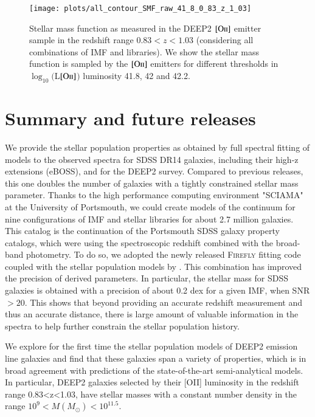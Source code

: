 \documentclass[onecolumn]{aa}
\newcommand{\OII}{$\left[\mathrm{O\textrm{\textsc{ii}}}\right]$\xspace}
\begin{document}
\begin{figure}
\begin{center}
\texttt{[image: plots/all\_contour\_SMF\_raw\_41\_8\_0\_83\_z\_1\_03]}
\label{fig:LF:sampling}
\caption{Stellar mass function as measured in the DEEP2 \OII emitter sample in the redshift range $0.83<z<1.03$ (considering all combinations of IMF and libraries). 
We show the stellar mass function is sampled by the \OII emitters for different thresholds in $\log_{10}($L\OII$)$ luminosity 41.8, 42 and 42.2.}  
\end{center}
\end{figure}

\section{Summary and future releases}

We provide the stellar population properties as obtained by full spectral fitting of models to the observed spectra for SDSS DR14 galaxies, including their high-z extensions (eBOSS), and for the DEEP2 survey. 
Compared to previous releases, this one doubles the number of galaxies with a tightly constrained stellar mass parameter.
Thanks to the high performance computing environment "SCIAMA" at the University of Portsmouth, we could create models of the continuum for nine configurations of IMF and stellar libraries for about 2.7 million galaxies. 
This catalog is the continuation of the Portsmouth SDSS galaxy property catalogs, which were using the spectroscopic redshift combined with the broad-band photometry.
To do so, we adopted the newly released \textsc{Firefly} fitting code coupled with the stellar population  models by \citet{Maraston_2011}. This combination has improved the precision of derived parameters. In particular, the stellar mass for SDSS galaxies is obtained with a precision of about 0.2 dex for a given IMF, when SNR$>20$. 
This shows that beyond providing an accurate redshift measurement and thus an accurate distance, there is large amount of valuable information in the spectra to help further constrain the stellar population history. 

We explore for the first time the stellar population models of DEEP2 emission line galaxies and find that these galaxies span a variety of properties, which is in broad agreement with predictions of the state-of-the-art semi-analytical models. In particular, DEEP2 galaxies selected by their [OII] luminosity in the redshift range 0.83<z<1.03, have stellar masses with a constant number density in the range $10^9<M(M_{\odot})<10^{11.5}$.
\end{document}
